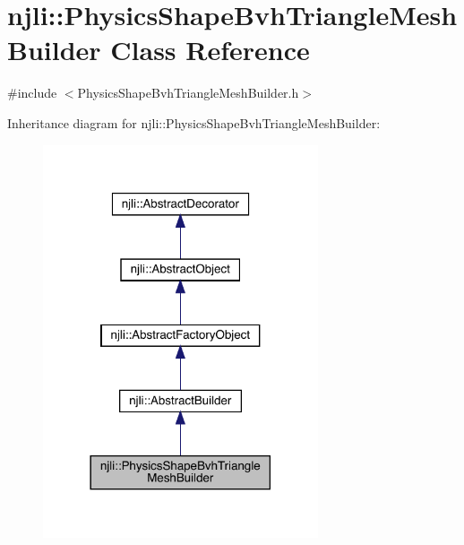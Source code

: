 \hypertarget{classnjli_1_1_physics_shape_bvh_triangle_mesh_builder}{}\section{njli\+:\+:Physics\+Shape\+Bvh\+Triangle\+Mesh\+Builder Class Reference}
\label{classnjli_1_1_physics_shape_bvh_triangle_mesh_builder}


{\ttfamily \#include $<$Physics\+Shape\+Bvh\+Triangle\+Mesh\+Builder.\+h$>$}



Inheritance diagram for njli\+:\+:Physics\+Shape\+Bvh\+Triangle\+Mesh\+Builder\+:\nopagebreak
\begin{figure}[H]
\begin{center}
\leavevmode
\includegraphics[width=230pt]{classnjli_1_1_physics_shape_bvh_triangle_mesh_builder__inherit__graph}
\end{center}
\end{figure}


